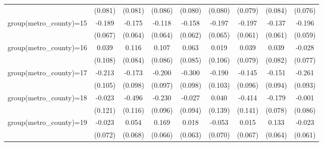 {\begin{tabular}{l*{8}{c}}
                    &     (0.081)         &     (0.081)         &     (0.086)         &     (0.080)         &     (0.080)         &     (0.079)         &     (0.084)         &     (0.076)         \\
group(metro\_county)=15&      -0.189\sym{***}&      -0.175\sym{**} &      -0.118\sym{*}  &      -0.158\sym{**} &      -0.197\sym{***}&      -0.197\sym{***}&      -0.137\sym{**} &      -0.196\sym{***}\\
                    &     (0.067)         &     (0.064)         &     (0.064)         &     (0.062)         &     (0.065)         &     (0.061)         &     (0.061)         &     (0.059)         \\
group(metro\_county)=16&       0.039         &       0.116         &       0.107         &       0.063         &       0.019         &       0.039         &       0.039         &      -0.028         \\
                    &     (0.108)         &     (0.084)         &     (0.086)         &     (0.085)         &     (0.106)         &     (0.079)         &     (0.082)         &     (0.077)         \\
group(metro\_county)=17&      -0.213\sym{**} &      -0.173\sym{*}  &      -0.200\sym{**} &      -0.300\sym{***}&      -0.190\sym{*}  &      -0.145         &      -0.151         &      -0.261\sym{***}\\
                    &     (0.105)         &     (0.098)         &     (0.097)         &     (0.098)         &     (0.103)         &     (0.096)         &     (0.094)         &     (0.093)         \\
group(metro\_county)=18&      -0.023         &      -0.496\sym{***}&      -0.230\sym{**} &      -0.027         &       0.040         &      -0.414\sym{***}&      -0.179\sym{**} &      -0.001         \\
                    &     (0.121)         &     (0.116)         &     (0.096)         &     (0.094)         &     (0.139)         &     (0.141)         &     (0.078)         &     (0.086)         \\
group(metro\_county)=19&      -0.023         &       0.054         &       0.169\sym{**} &       0.018         &      -0.053         &       0.015         &       0.133\sym{**} &      -0.023         \\
                    &     (0.072)         &     (0.068)         &     (0.066)         &     (0.063)         &     (0.070)         &     (0.067)         &     (0.064)         &     (0.061)         \\

\end{tabular}}
